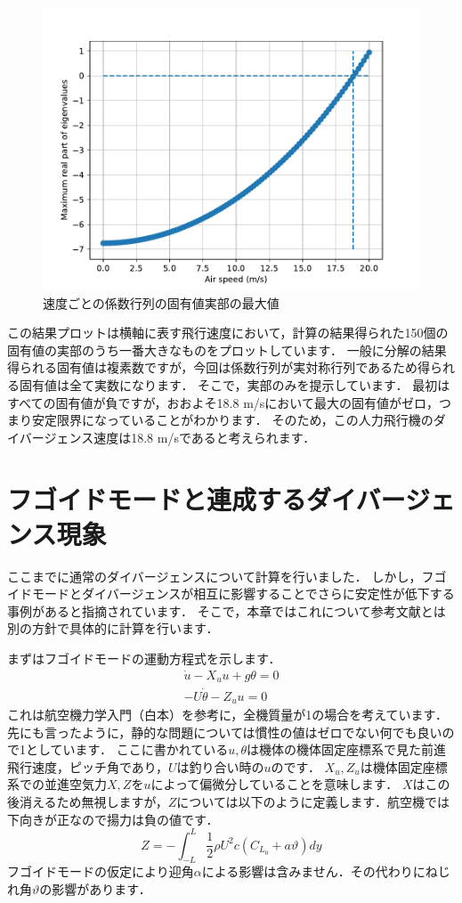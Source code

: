 \documentclass{jarticle}
\begin{document}
\begin{figure}[H]
    \centering
    \includegraphics[width=0.8\linewidth]{image/Eigenvalues_of_divergence.pdf}
    \caption{速度ごとの係数行列の固有値実部の最大値}
    \label{eigen1}
\end{figure}

この結果プロットは横軸に表す飛行速度において，計算の結果得られた150個の固有値の実部のうち一番大きなものをプロットしています．
一般に分解の結果得られる固有値は複素数ですが，今回は係数行列が実対称行列であるため得られる固有値は全て実数になります．
そこで，実部のみを提示しています．
最初はすべての固有値が負ですが，おおよそ18.8 m/sにおいて最大の固有値がゼロ，つまり安定限界になっていることがわかります．
そのため，この人力飛行機のダイバージェンス速度は18.8 m/sであると考えられます．

\section{フゴイドモードと連成するダイバージェンス現象}

ここまでに通常のダイバージェンスについて計算を行いました．
しかし，フゴイドモードとダイバージェンスが相互に影響することでさらに安定性が低下する事例があると指摘されています\cite{takasaki}．
そこで，本章ではこれについて参考文献とは別の方針で具体的に計算を行います．

まずはフゴイドモードの運動方程式を示します．
\begin{align} 
    \dot{u} - X_u u + g \theta = 0\\
    -U\dot{\theta} - Z_u u = 0
\end{align}
これは航空機力学入門（白本）\cite{sirohon}を参考に，全機質量が1の場合を考えています．先にも言ったように，静的な問題については慣性の値はゼロでない何でも良いので1としています．
ここに書かれている$u,\theta$は機体の機体固定座標系で見た前進飛行速度，ピッチ角であり，$U$は釣り合い時の$u$のです．
$X_u,Z_u$は機体固定座標系での並進空気力$X,Z$を$u$によって偏微分していることを意味します．
$X$はこの後消えるため無視しますが，$Z$については以下のように定義します．航空機では下向きが正なので揚力は負の値です．
\begin{equation}
    Z = -\int_{-L}^L \frac{1}{2}\rho U^2 c (C_{L_0} + a\vartheta) dy
\end{equation}
フゴイドモードの仮定により迎角$\alpha$による影響は含みません．その代わりにねじれ角$\vartheta$の影響があります．
\end{document}
